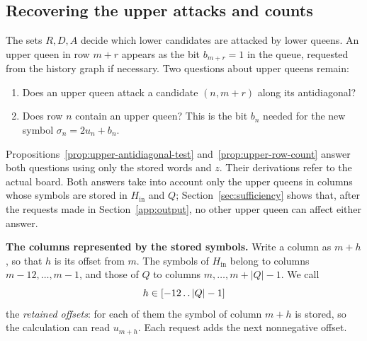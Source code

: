 \subsection{Recovering the upper attacks and counts}\label{app:upper}

The sets $R,D,A$ decide which lower candidates are attacked by lower
queens. An upper queen in row $m+r$ appears as the bit $b_{m+r}=1$ in
the queue, requested from the history graph if necessary. Two
questions about upper queens remain:
\begin{enumerate}
\item Does an upper queen attack a candidate $(n,m+r)$ along its
antidiagonal?
\item Does row $n$ contain an upper queen? This is the bit $b_n$
needed for the new symbol $\sigma_n=2u_n+b_n$.
\end{enumerate}
Propositions~\ref{prop:upper-antidiagonal-test}
and~\ref{prop:upper-row-count} answer both questions using only the
stored words and $z$. Their derivations refer to the actual board.
Both answers take into account only the upper queens in columns
whose symbols are stored in $H_{\mathrm{in}}$ and $Q$;
Section~\ref{sec:sufficiency} shows that, after the requests made in
Section~\ref{app:output}, no other upper queen can affect either
answer.

\medskip\noindent
\textbf{The columns represented by the stored symbols.}
Write a column as $m+h$, so that $h$ is its offset from $m$. The
symbols of $H_{\mathrm{in}}$ belong to columns $m-12,\dots,m-1$, and
those of $Q$ to columns $m,\dots,m+|Q|-1$. We call
\[
 h\in[-12\mathinner{\ldotp\ldotp}|Q|-1]
\]
the \emph{retained offsets}: for each of them the symbol of column
$m+h$ is stored, so the calculation can read $u_{m+h}$. Each request
adds the next nonnegative offset.

